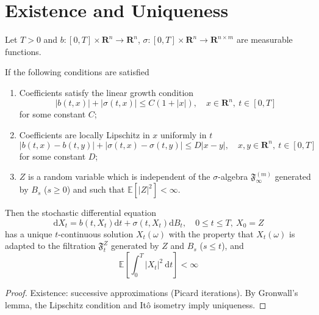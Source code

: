 \begin{example}
    
\end{example}

\begin{example}
    
\end{example}

\begin{example}
    
\end{example}

\section{Existence and Uniqueness}

\begin{theorem}
    Let $T > 0$ and $b : [0,T] \times \textbf{R}^n \longrightarrow \textbf{R}^n$, $\sigma : [0,T] \times \textbf{R}^n \longrightarrow \textbf{R}^{n \times m}$ are measurable functions.

    If the following conditions are satisfied
    \begin{enumerate}
        \item Coefficients satisfy the linear growth condition \[ |b(t,x)| + |\sigma(t,x)| \leq C(1 + |x|), \quad x \in \textbf{R}^n, ~t \in [0,T] \] for some constant $C$;
        \item Coefficients are locally Lipschitz in $x$ uniformly in $t$
        \[
            |b(t,x) - b(t,y)| + |\sigma(t,x) - \sigma(t,y)| \leq D|x-y|, \quad x,y \in \textbf{R}^n, ~t \in [0,T]
        \]
        for some constant $D$;
        \item $Z$ is a random variable which is independent of the $\sigma$-algebra $\mathfrak{F}_\infty^{(m)}$ generated by $B_s$ ($s \geq 0$) and such that $\mathbb{E}[|Z|^2] < \infty$.
    \end{enumerate}
    
    Then the stochastic differential equation 
    \[
        \mathrm{d}X_t = b(t, X_t)\mathrm{d}t + \sigma(t, X_t) \mathrm{d}B_t, \quad 0 \leq t \leq T, ~X_0 = Z
    \]
    has a unique $t$-continuous solution $X_t(\omega)$ with the property that $X_t(\omega)$ is adapted to the filtration $\mathfrak{F}_t^Z$ generated by $Z$ and $B_s$ ($s \leq t$), and 
    \[
        \mathbb{E}\left[ \int_0^T |X_t|^2~\mathrm{d}t \right] < \infty
    \]
\end{theorem}

\begin{proof}
    Existence: successive approximations (Picard iterations). By Gronwall's lemma, the Lipschitz condition and Itô isometry imply uniqueness.
\end{proof}